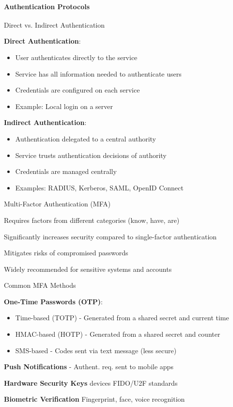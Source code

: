 \paragraph{Authentication Protocols}

\begin{concept}{Direct vs. Indirect Authentication}
    
    \textbf{Direct Authentication}:
    \begin{itemize}
        \item User authenticates directly to the service
        \item Service has all information needed to authenticate users
        \item Credentials are configured on each service
        \item Example: Local login on a server
    \end{itemize}

    \textbf{Indirect Authentication}:
    \begin{itemize}
        \item Authentication delegated to a central authority
        \item Service trusts authentication decisions of authority
        \item Credentials are managed centrally
        \item Examples: RADIUS, Kerberos, SAML, OpenID Connect
    \end{itemize}
\end{concept}

\begin{definition}{Multi-Factor Authentication (MFA)}

    Requires factors from different categories (know, have, are)

    Significantly increases security compared to single-factor authentication

    Mitigates risks of compromised passwords

    Widely recommended for sensitive systems and accounts

\end{definition}

\begin{concept}{Common MFA Methods}

     \textbf{One-Time Passwords (OTP)}:
    \begin{itemize}
        \item Time-based (TOTP) - Generated from a shared secret and current time
        \item HMAC-based (HOTP) - Generated from a shared secret and counter
        \item SMS-based - Codes sent via text message (less secure)
    \end{itemize}

    \textbf{Push Notifications} - Authent. req. sent to mobile apps

     \textbf{Hardware Security Keys} devices FIDO/U2F standards

     \textbf{Biometric Verification} Fingerprint, face, voice recognition

\end{concept}

